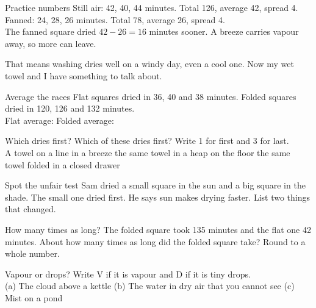\begin{worked}{Practice numbers}
Still air: 42, 40, 44 minutes. Total 126, average 42, spread 4.\\
Fanned: 24, 28, 26 minutes. Total 78, average 26, spread 4.\\
The fanned square dried $42-26=16$ minutes sooner. A breeze carries vapour away, so more can leave.
\end{worked}

\begin{multix}[ok]\multixbot[ok]\tcblower
That means washing dries well on a windy day, even a cool one. Now my wet towel and I have something to talk about.
\end{multix}

\clearpage

\begin{puzzle}{Average the races}
Flat squares dried in 36, 40 and 38 minutes. Folded squares dried in 120, 126 and 132 minutes.\\
Flat average: \wline[1.6cm] \quad Folded average: \wline[1.6cm]
\end{puzzle}

\begin{puzzle}{Which dries first?}
Which of these dries first? Write 1 for first and 3 for last.\\
A towel on a line in a breeze \wline[1cm] \quad the same towel in a heap on the floor \wline[1cm] \quad the same towel folded in a closed drawer \wline[1cm]
\end{puzzle}

\begin{puzzle}{Spot the unfair test}
Sam dried a small square in the sun and a big square in the shade. The small one dried first. He says sun makes drying faster. List two things that changed. \wline[6cm]
\end{puzzle}

\begin{puzzle}{How many times as long?}
The folded square took 135 minutes and the flat one 42 minutes. About how many times as long did the folded square take? Round to a whole number. \wline[1.6cm]
\end{puzzle}

\begin{puzzle}{Vapour or drops?}
Write V if it is vapour and D if it is tiny drops.\\
(a) The cloud above a kettle \wline[1cm] \quad (b) The water in dry air that you cannot see \wline[1cm] \quad (c) Mist on a pond \wline[1cm]
\end{puzzle}


